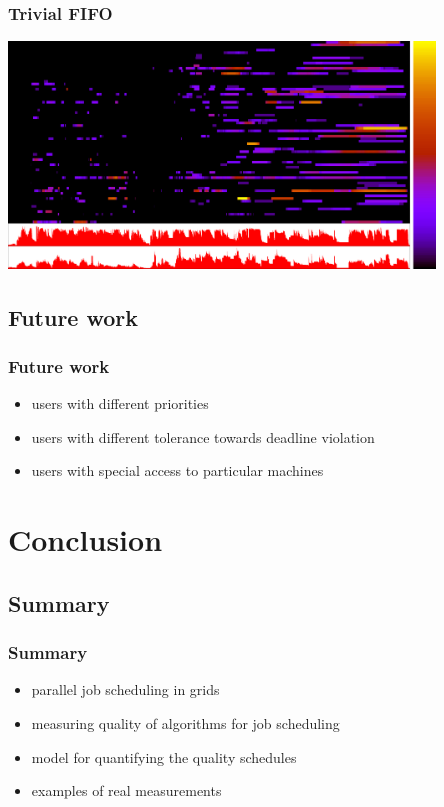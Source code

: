 \begin{frame}
	\frametitle{Trivial FIFO}
	\begin{center}
	\includegraphics[width=0.85\textwidth]{none_fifo.png}
	\end{center}
\end{frame}

\subsection{Future work}

\begin{frame}
	\frametitle{Future work}
	\begin{itemize}
		\item users with different priorities \pause
		\item users with different tolerance towards deadline violation \pause
		\item users with special access to particular machines
	\end{itemize}
\end{frame}

\section{Conclusion}
\subsection{Summary}

\begin{frame}
	\frametitle{Summary}
	\begin{itemize}
		\item parallel job scheduling in grids \pause
		\item measuring quality of algorithms for job scheduling \pause
		\item model for quantifying the quality schedules \pause
		\item examples of real measurements
	\end{itemize}
\end{frame}

